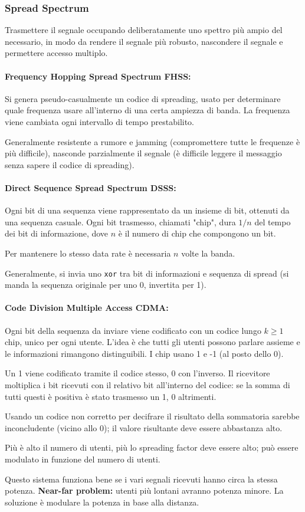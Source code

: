 \subsubsection{Spread Spectrum}

Trasmettere il segnale occupando deliberatamente uno spettro più ampio del necessario, in modo da rendere il segnale più robusto, nascondere il segnale e permettere accesso multiplo.

\paragraph{Frequency Hopping Spread Spectrum FHSS:} Si genera pseudo-casualmente un codice di spreading, usato per determinare quale frequenza usare all'interno di una certa ampiezza di banda. La frequenza viene cambiata ogni intervallo di tempo prestabilito.

Generalmente resistente a rumore e jamming (compromettere tutte le frequenze è più difficile), nasconde parzialmente il segnale (è difficile leggere il messaggio senza sapere il codice di spreading).

\paragraph{Direct Sequence Spread Spectrum DSSS:} Ogni bit di una sequenza viene rappresentato da un insieme di bit, ottenuti da una sequenza casuale. Ogni bit trasmesso, chiamati "chip", dura $1/n$ del tempo dei bit di informazione, dove $n$ è il numero di chip che compongono un bit. 

Per mantenere lo stesso data rate è necessaria $n$ volte la banda.

Generalmente, si invia uno \texttt{xor} tra bit di informazioni e sequenza di spread (si manda la sequenza originale per uno 0, invertita per 1).

\paragraph{Code Division Multiple Access CDMA:} Ogni bit della sequenza da inviare viene codificato con un codice lungo $k \geq 1$ chip, unico per ogni utente. L'idea è che tutti gli utenti possono parlare assieme e le informazioni rimangono distinguibili. I chip usano 1 e -1 (al posto dello 0).

Un 1 viene codificato tramite il codice stesso, 0 con l'inverso. Il ricevitore moltiplica i bit ricevuti con il relativo bit all'interno del codice: se la somma di tutti questi è positiva è stato trasmesso un 1, 0 altrimenti.

Usando un codice non corretto per decifrare il risultato della sommatoria sarebbe inconcludente (vicino allo 0); il valore risultante deve essere abbastanza alto.

Più è alto il numero di utenti, più lo spreading factor deve essere alto; può essere modulato in funzione del numero di utenti.

Questo sistema funziona bene se i vari segnali ricevuti hanno circa la stessa potenza. \textbf{Near-far problem:} utenti più lontani avranno potenza minore. La soluzione è modulare la potenza in base alla distanza.
